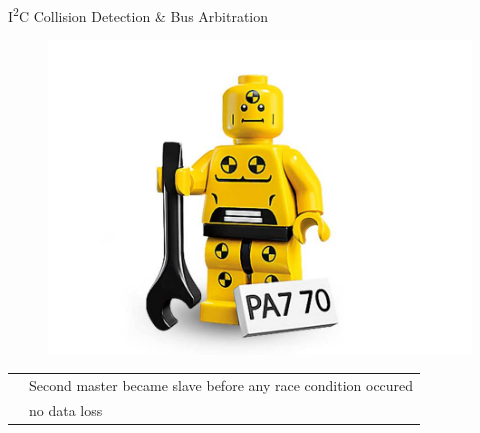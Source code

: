 \documentclass[]{beamer} %
\newcommand{\greenbullet}{\textcolor{bettergreen}\textbullet}
\newcommand{\twi}{I\textsuperscript{2}C\xspace}
\begin{document}
\begin{frame}[fragile]{\twi Collision Detection \& Bus Arbitration}
\begin{minipage}[c][.4\textheight][c]{\linewidth}
			\begin{figure}
				\includegraphics[width=\textwidth,height=0.8\textheight,keepaspectratio]{dummy}
			\end{figure}
		\begin{tabular}{p{0.15cm} l}
			\greenbullet & Second master became slave before any race condition occured\\
			\greenbullet & \textrightarrow no data loss\\
		\end{tabular}
	\end{minipage}
\end{frame}
\end{document}
